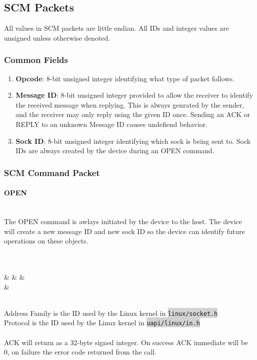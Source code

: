 \documentclass[10pt]{article}
\begin{document}
	\subsection{SCM Packets} \mbox{}
	All values in SCM packets are little endian. All IDs and integer values are unsigned unless otherwise denoted.
	\subsubsection{Common Fields}
	\begin{enumerate}
		\item \textbf{Opcode}: 8-bit unsigned integer identifying what type of packet follows.
		\item \textbf{Message ID}: 8-bit unsigned integer provided to allow the receiver to identify the received message when replying. This is always genrated by the sender, and the receiver may only reply using the given ID once. Sending an ACK or REPLY to an unknown Message ID causes undefiend behavior.
		\item \textbf{Sock ID}: 8-bit unsigned integer identifying which sock is being sent to. Sock IDs are always created by the device during an OPEN command.
	\end{enumerate}
	\subsubsection{SCM Command Packet}
	\setcounter{secnumdepth}{5}
	\paragraph{OPEN} \mbox{}\\
	The OPEN command is awlays initiated by the device to the host. The device will create a new message ID and new sock ID so the device can identify future operations on these objects.\\
	\\
	\begin{bytefield}[bitwidth=1.7em]{32}
		 \\
			 &
			 &
			 &
			 \\
			 &
			 \\
	\end{bytefield}\\
	Address Family is the ID used by the Linux kernel in \colorbox{lightgray}{\lstinline{linux/socket.h}}\\
	Protocol is the ID used by the Linux kernel in \colorbox{lightgray}{\lstinline{uapi/linux/in.h}}\\
	\\
	ACK will return as a 32-byte signed integer. On success ACK immediate will be 0, on failure the error code returned from the call.
	
\end{document}
